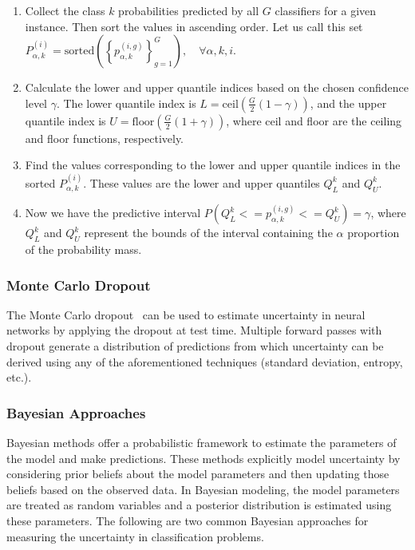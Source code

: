 \begin{enumerate}
    \item Collect the class $k $ probabilities predicted by all $G$ classifiers for a given instance. Then sort the values in ascending order. Let us call this set $P_{\alpha,k}^{(i)}=\mathrm{sorted}\left(\left\{p_{\alpha,k}^{(i,g)}\right\}_{g=1}^G\right),\quad\forall \alpha,k,i $.

    \item Calculate the lower and upper quantile indices based on the chosen confidence level $\gamma $. The lower quantile index is $L=\mathrm{ceil}\left(\frac{G}{2}\left(1-\gamma\right)\right) $, and the upper quantile index is $U=\mathrm{floor}\left(\frac{G}{2} (1+\gamma)\right) $, where ceil and floor are the ceiling and floor functions, respectively.

    \item Find the values corresponding to the lower and upper quantile indices in the sorted $P_{\alpha,k}^{(i)} $. These values are the lower and upper quantiles $Q_L^{k} $ and $Q_U^{k} $.

    \item Now we have the predictive interval $P\left(Q_L^{k}<=p_{\alpha,k}^{(i,g)}<=Q_U^{k}\right)=\gamma $, where $Q_L^{k} $ and $Q_U^{k} $ represent the bounds of the interval containing the $\alpha$ proportion of the probability mass.
\end{enumerate}

\subsubsection{Monte Carlo Dropout}
The Monte Carlo dropout~\cite{gal_Dropout_2016a} can be used to estimate uncertainty in neural networks by applying the dropout at test time. Multiple forward passes with dropout generate a distribution of predictions from which uncertainty can be derived using any of the aforementioned techniques (standard deviation, entropy, etc.).

\subsubsection{Bayesian Approaches}
Bayesian methods offer a probabilistic framework to estimate the parameters of the model and make predictions. These methods explicitly model uncertainty by considering prior beliefs about the model parameters and then updating those beliefs based on the observed data. In Bayesian modeling, the model parameters are treated as random variables and a posterior distribution is estimated using these parameters. The following are two common Bayesian approaches for measuring the uncertainty in classification problems.


